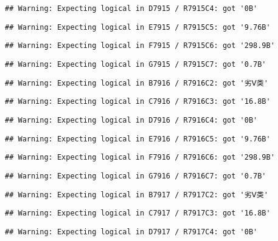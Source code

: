 \documentclass[
]{article}
\begin{document}
\begin{verbatim}
## Warning: Expecting logical in D7915 / R7915C4: got '0B'
\end{verbatim}

\begin{verbatim}
## Warning: Expecting logical in E7915 / R7915C5: got '9.76B'
\end{verbatim}

\begin{verbatim}
## Warning: Expecting logical in F7915 / R7915C6: got '298.9B'
\end{verbatim}

\begin{verbatim}
## Warning: Expecting logical in G7915 / R7915C7: got '0.7B'
\end{verbatim}

\begin{verbatim}
## Warning: Expecting logical in B7916 / R7916C2: got '劣Ⅴ类'
\end{verbatim}

\begin{verbatim}
## Warning: Expecting logical in C7916 / R7916C3: got '16.8B'
\end{verbatim}

\begin{verbatim}
## Warning: Expecting logical in D7916 / R7916C4: got '0B'
\end{verbatim}

\begin{verbatim}
## Warning: Expecting logical in E7916 / R7916C5: got '9.76B'
\end{verbatim}

\begin{verbatim}
## Warning: Expecting logical in F7916 / R7916C6: got '298.9B'
\end{verbatim}

\begin{verbatim}
## Warning: Expecting logical in G7916 / R7916C7: got '0.7B'
\end{verbatim}

\begin{verbatim}
## Warning: Expecting logical in B7917 / R7917C2: got '劣Ⅴ类'
\end{verbatim}

\begin{verbatim}
## Warning: Expecting logical in C7917 / R7917C3: got '16.8B'
\end{verbatim}

\begin{verbatim}
## Warning: Expecting logical in D7917 / R7917C4: got '0B'
\end{verbatim}
\end{document}
